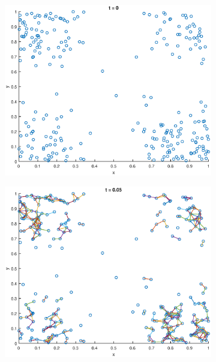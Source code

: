 \documentclass[10pt]{article}
\begin{document}
\begin{figure}[H]
  \centering
  \caption{Minkowski clustering for different threshold values.}
	\begin{subfigure}[b]{.49\textwidth}
		\includegraphics[width=\columnwidth]{Ass1_0.eps}
		\caption{}
		\label{fig1a}
	\end{subfigure}  
	\begin{subfigure}[b]{.49\textwidth}
		\includegraphics[width=\columnwidth]{Ass1_5.eps}
		\caption{}
		\label{fig1b}
	\end{subfigure}

\end{figure}
\end{document}
